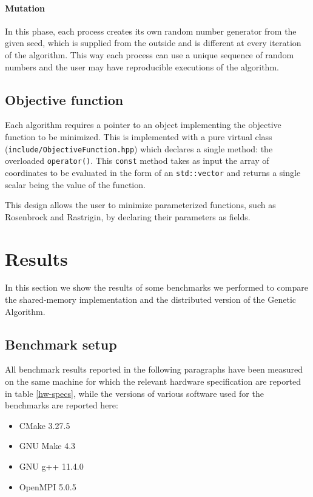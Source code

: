 \documentclass[12pt,a4paper,oneside]{article}
\begin{document}
	\paragraph{Mutation}
	In this phase, each process creates its own random number generator from the given seed, which is supplied from the outside and is different at every iteration of the algorithm.
	This way each process can use a unique sequence of random numbers and the user may have reproducible executions of the algorithm.

	\subsection{Objective function}
	Each algorithm requires a pointer to an object implementing the objective function to be minimized.
	This is implemented with a pure virtual class (\texttt{include/ObjectiveFunction.hpp}) which declares a single method: the overloaded \texttt{operator()}.
	This \texttt{const} method takes as input the array of coordinates to be evaluated in the form of an \texttt{std::vector} and returns a single scalar being the value of the function.

	This design allows the user to minimize parameterized functions, such as Rosenbrock and Rastrigin, by declaring their parameters as fields.
	
	\clearpage
	\section{Results}
	In this section we show the results of some benchmarks we performed to compare the shared-memory implementation and the distributed version of the Genetic Algorithm.

	\subsection{Benchmark setup}
	All benchmark results reported in the following paragraphs have been measured on the same machine for which the relevant hardware specification are reported in table \ref{hw-specs}, while the versions of various software used for the benchmarks are reported here:
	
	\begin{itemize}
		\item CMake 3.27.5
		\item GNU Make 4.3
		\item GNU g++ 11.4.0
		\item OpenMPI 5.0.5
	\end{itemize}
\end{document}
